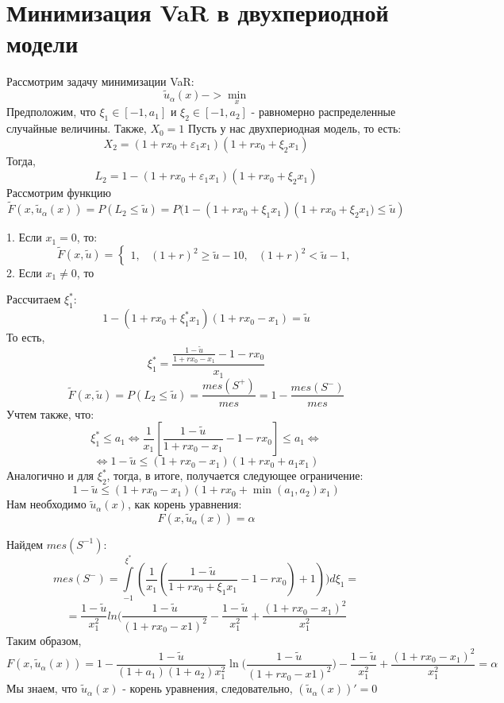 \documentclass[14pt,a4paper]{article}
\theoremstyle{plain}
\theoremstyle{definition}
\begin{document}
 \section{Минимизация VaR в двухпериодной модели}

Рассмотрим задачу минимизации VaR:
$$
\tilde{u}_\alpha (x) -> \min\limits_x
$$
Предположим, что $\xi_1 \in [-1, a_1]$ и $\xi_2 \in [-1, a_2]$ - равномерно распределенные случайные величины.
Также, $X_0 = 1$
Пусть у нас двухпериодная модель, то есть:
$$
X_2 = (1+rx_0+\varepsilon_1 x_1)(1+rx_0+\xi_2 x_1)
$$
Тогда,
$$
L_2 = 1-(1+rx_0+\varepsilon_1 x_1)(1+rx_0+\xi_2 x_1)
$$
Рассмотрим функцию
$$
\tilde{F}(x,\tilde{u}_\alpha (x) ) = P(L_2 \le \tilde{u}) = P\big(1-(1+rx_0+\xi_1 x_1)(1+rx_0+\xi_2 x_1\big) \le \tilde{u})
$$

1. Если $x_1 = 0$, то:
$$
\tilde{F}(x,\tilde{u}) =
\left\{\begin{matrix}
1, &(1+r)^2 \ge \tilde{u}-1
0, &(1+r)^2 < \tilde{u}-1,
\end{matrix}\right.
$$
2. Если $x_1 \neq0$, то

Рассчитаем $\xi_1^*$:
$$
1- (1+rx_0+\xi_1^* x_1)(1+rx_0- x_1) = \tilde{u}
$$
То есть,
$$
\xi_1^* = \frac{\frac{1-\tilde{u}}{1+rx_0-x_1}-1-rx_0}{x_1}
$$
$$
\tilde{F}(x,\tilde{u}) = P(L_2\le \tilde{u})=\frac{mes(S^+)}{mes} = 1-\frac{mes(S^-)}{mes}
$$
Учтем также, что:
$$
\xi_1^* \le a_1 \Leftrightarrow \frac{1}{x_1}[\frac{1-\tilde{u}}{1+rx_0-x_1} -1-rx_0]\le a_1\Leftrightarrow
$$
$$
\Leftrightarrow 1-\tilde{u} \le(1+rx_0-x_1)(1+rx_0+a_1 x_1)
$$
Аналогично и для $\xi_2^*$, тогда, в итоге, получается следующее ограничение:
$$
1-\tilde{u} \le(1+rx_0-x_1)(1+rx_0+\min(a_1,a_2) x_1)
$$
\vspace{15pt}
Нам необходимо $\tilde{u}_\alpha (x)$, как корень уравнения:
$$
F(x,\tilde{u}_\alpha (x)) = \alpha
$$


Найдем $mes(S^{-1})$:
$$
mes(S^-)=\int\limits_{-1}^{\xi^*} (\frac{1}{x_1}(\frac{1 - \tilde{u}}{1+rx_0+\xi_1 x_1}-1-rx_0)+1)) d\xi_1 =
$$
$$
=\frac{1 - \tilde{u}}{x_1^2}ln(\frac{1 - \tilde{u}}{(1+rx_0-x1)^2}-\frac{1 - \tilde{u}}{x_1^2}+\frac{(1+rx_0-x_1)^2}{x_1^2}
$$
Таким образом,
$$
F(x,\tilde{u}_\alpha (x)) = 1 -\frac{1 - \tilde{u}}{(1+a_1)(1+a_2)x_1^2}\ln\Big(\frac{1 - \tilde{u}}{(1+rx_0-x1)^2}\Big)-\frac{1 - \tilde{u}}{x_1^2}+\frac{(1+rx_0-x_1)^2}{x_1^2} = \alpha
$$
Мы знаем, что $\tilde{u}_\alpha (x)$ - корень уравнения, следовательно, $(\tilde{u}_\alpha (x))' = 0$
\end{document}
